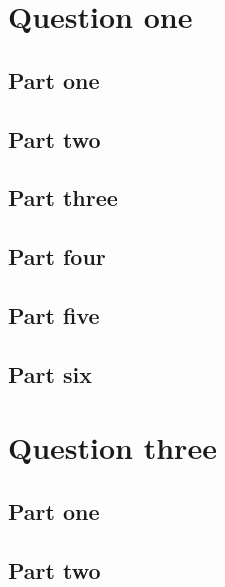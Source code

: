 \documentclass{article}
\begin{document}
\section{Question one}

\subsection{Part one}

\subsection{Part two}

\subsection{Part three}

\subsection{Part four}

\subsection{Part five}

\subsection{Part six}



\section{Question three}
\subsection{Part one}

\subsection{Part two}

\end{document}
